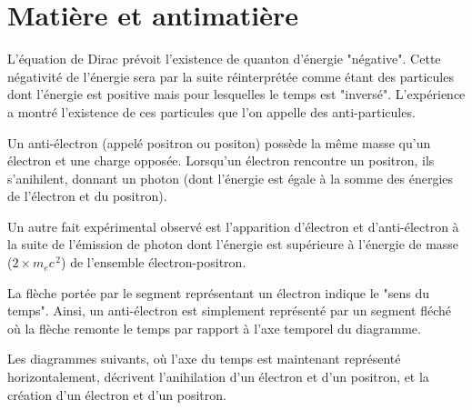 

\section{Matière et antimatière}



L'équation de Dirac prévoit l'existence de quanton d'énergie "négative". Cette négativité de l'énergie sera par la suite réinterprétée comme étant des particules dont l'énergie est positive mais pour lesquelles le temps est "inversé". L'expérience a montré l'existence de ces particules que l'on appelle des anti-particules.

Un anti-électron (appelé positron ou positon) possède la même masse qu'un électron et une charge opposée. Lorsqu'un électron rencontre un positron, ils s'anihilent, donnant un photon (dont l'énergie est égale à la somme des énergies de l'électron et du positron).

Un autre fait expérimental observé est l'apparition d'électron et d'anti-électron à la suite de l'émission de photon dont l'énergie est supérieure à l'énergie de masse ($2\times m_ec^{\,2}$) de l'ensemble électron-positron.

La flèche portée par le segment représentant un électron indique le "sens du temps". Ainsi, un anti-électron est simplement représenté par un segment fléché où la flèche remonte le temps par rapport à l'axe temporel du diagramme.

Les diagrammes suivants, où l'axe du temps est maintenant représenté horizontalement, décrivent l'anihilation d'un électron et d'un positron, et la création d'un électron et d'un positron.

